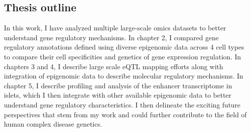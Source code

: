 \subsection{Thesis outline}
In this work, I have analyzed multiple large-scale omics datasets to better understand gene regulatory mechanisms. In chapter 2, I compared gene regulatory annotations defined using diverse epigenomic data across 4 cell types to compare their cell specificities and genetics of gene expression regulation. In chapters 3 and 4, I describe large scale eQTL mapping efforts along with integration of epigenomic data to describe molecular regulatory mechanisms. In chapter 5, I describe profiling and analysis of the enhancer transcriptome in islets, which I then integrate with other available epigenomic data to better understand gene regulatory characteristics. I then delineate the exciting future perspectives that stem from my work and could further contribute to the field of human complex disease genetics.